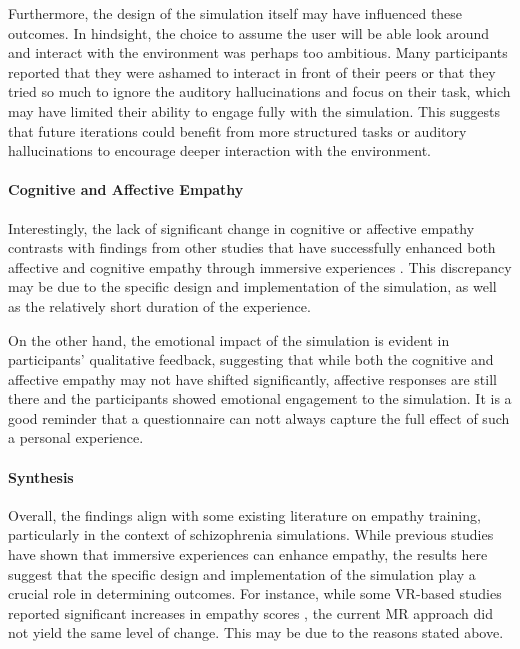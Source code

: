 \vspace{1em}

Furthermore, the design of the simulation itself may have influenced these outcomes. In hindsight, the choice to assume the user will be able look around and interact with the environment was perhaps too ambitious. Many participants reported that they were ashamed to interact in front of their peers or that they tried so much to ignore the auditory hallucinations and focus on their task, which may have limited their ability to engage fully with the simulation. This suggests that future iterations could benefit from more structured tasks or auditory hallucinations to encourage deeper interaction with the environment.

\paragraph{Cognitive and Affective Empathy}
Interestingly, the lack of significant change in cognitive or affective empathy contrasts with findings from other studies that have successfully enhanced both affective and cognitive empathy through immersive experiences \cite{Rueda2020, Ando2011}. This discrepancy may be due to the specific design and implementation of the simulation, as well as the relatively short duration of the experience.

On the other hand, the emotional impact of the simulation is evident in participants' qualitative feedback, suggesting that while both the cognitive and affective empathy may not have shifted significantly, affective responses are still there and the participants showed emotional engagement to the simulation. It is a good reminder that a questionnaire can nott always capture the full effect of such a personal experience.

\paragraph{Synthesis}
Overall, the findings align with some existing literature on empathy training, particularly in the context of schizophrenia simulations. While previous studies have shown that immersive experiences can enhance empathy, the results here suggest that the specific design and implementation of the simulation play a crucial role in determining outcomes. For instance, while some VR-based studies reported significant increases in empathy scores \cite{Martingano2021, Ventura2020}, the current MR approach did not yield the same level of change. This may be due to the reasons stated above.



